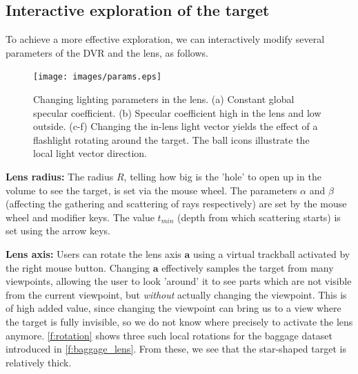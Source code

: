 \subsection{Interactive exploration of the target}
\label{sec:inter_expl}
%
To achieve a more effective exploration, we can interactively modify several parameters of the DVR and the lens, as follows.
%
\begin{figure}
\centering

\texttt{[image: images/params.eps]}

\caption[Changing lighting parameters in the lens.]{Changing lighting parameters in the lens. (a) Constant global specular coefficient. (b) Specular coefficient high in the lens and low outside. (c-f) Changing the in-lens light vector yields the effect of a flashlight rotating around the target. The ball icons illustrate the local light vector direction.}
\label{f:params}

\end{figure}
%



\par \textbf{Lens radius:} The radius $R$, telling how big is the 'hole' to open up in the volume to see the target, is set via the mouse wheel. The parameters $\alpha$ and $\beta$ (affecting the gathering and scattering of rays respectively) are set by the mouse wheel and modifier keys. The value $t_{min}$ (depth from which scattering starts) is set using the arrow keys.

\par  \textbf{Lens axis:} Users can rotate the lens axis $\mathbf{a}$ using a virtual trackball activated by the right mouse button. Changing $\mathbf{a}$ effectively samples the target from many viewpoints, allowing the user to look 'around' it to see parts which are not visible from the current viewpoint, but \emph{without} actually changing the viewpoint. This is of high added value, since changing the viewpoint can bring us to a view where the target is fully invisible, so we do not know where precisely to activate the lens anymore. \autoref{f:rotation} shows three such local rotations for the baggage dataset introduced in  \autoref{f:baggage_lens}. From these, we see that the star-shaped target is relatively thick.


